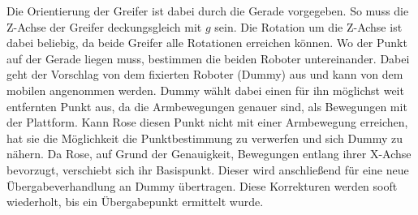 Die Orientierung der Greifer ist dabei durch die Gerade vorgegeben. So muss die Z-Achse der Greifer deckungsgleich mit $g$ sein. Die Rotation um die Z-Achse ist dabei beliebig, da beide Greifer alle Rotationen erreichen können. Wo der Punkt auf der Gerade liegen muss, bestimmen die beiden Roboter untereinander. Dabei geht der Vorschlag von dem fixierten Roboter (Dummy) aus und kann von dem mobilen angenommen werden. Dummy wählt dabei einen für ihn möglichst weit entfernten Punkt aus, da die Armbewegungen genauer sind, als Bewegungen mit der Plattform. Kann Rose diesen Punkt nicht mit einer Armbewegung erreichen, hat sie die Möglichkeit die Punktbestimmung zu verwerfen und sich Dummy zu nähern. Da Rose, auf Grund der Genauigkeit, Bewegungen entlang ihrer X-Achse bevorzugt, verschiebt sich ihr Basispunkt. Dieser wird anschließend für eine neue Übergabeverhandlung an Dummy übertragen. Diese Korrekturen werden sooft wiederholt, bis ein Übergabepunkt ermittelt wurde.